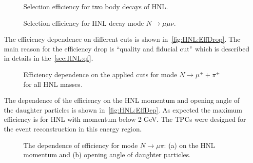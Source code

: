 \documentclass[../main.tex]{subfiles}
\begin{document}
\begin{figure}[!ht]
  \begin{minipage}{0.49\linewidth}
  \end{minipage}
  \hfill
  \begin{minipage}{0.49\linewidth}
  \end{minipage}
  \caption{Selection efficiency for two body decays of HNL.}
  \label{fig:HNL:Eff1}
\end{figure}

\begin{figure}[!ht]
  \caption{Selection efficiency for HNL decay mode $N\to\mu\mu\nu$.}
  \label{fig:HNL:Eff2}
\end{figure}
The efficiency dependence on different cuts is shown in~\autoref{fig:HNL:EffDrop}. The main reason for the efficiency drop is ``quality and fiducial cut'' which is described in details in the~\autoref{sec:HNL:qf}.
\begin{figure}[!ht]
  \caption{Efficiency dependence on the applied cuts for mode $N\to\mu^\mp+\pi^\pm$ for all HNL masses.}
  \label{fig:HNL:EffDrop}
\end{figure}

The dependence of the efficiency on the HNL momentum and opening angle of the daughter particles is shown in~\autoref{fig:HNL:EffDep}. As expected the maximum efficiency is for HNL with momentum below 2 GeV. The TPCs were designed for the event reconstruction in this energy region.
\begin{figure}[!ht]
  \begin{minipage}{0.49\linewidth}
  \end{minipage}
  \hfill
  \begin{minipage}{0.49\linewidth}
  \end{minipage}
  \caption{The dependence of efficiency for mode $N\to\mu\pi$: (a) on the HNL momentum and (b) opening angle of daughter particles.}
  \label{fig:HNL:EffDep}
\end{figure}
\end{document}
